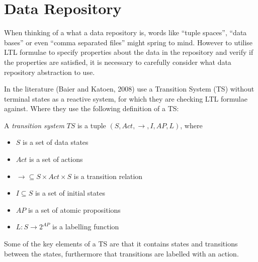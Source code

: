 \section{Data Repository}
When thinking of a what a data repository is, words like ``tuple spaces'', ``data bases'' or even ``comma separated files'' might spring to mind. However to utilise LTL formulae to specify properties about the data in the repository and verify if the properties are satisfied, it is necessary to carefully consider what data repository abstraction to use. 

In the literature (Baier and Katoen, 2008)\cite{baier2008principles} use a Transition System (TS) without terminal states as a reactive system, for which they are checking LTL formulae against. Where they use the following definition of a TS:
\begin{definition}\label{def:ts}
A \emph{transition system} $TS$ is a tuple $\left(S, Act, \longrightarrow, I, AP, L \right)$, where
\begin{itemize}
  \item $S$ is a set of data states
  \item $Act$ is a set of actions
  \item $\longrightarrow \subseteq S \times Act \times S$ is a transition relation
  \item $I \subseteq S$ is a set of initial states
  \item $AP$ is a set of atomic propositions
  \item $L : S \rightarrow 2^{AP}$ is a labelling function
\end{itemize}
\end{definition}
Some of the key elements of a TS are that it contains states and transitions between the states, furthermore that transitions are labelled with an action. 

